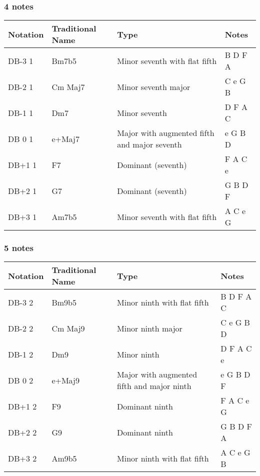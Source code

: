 \documentclass[]{report}
\begin{document}
\subsubsection*{4 notes}
\begin{table}[H]
\centering
\begin{tabularx}{\textwidth}{ll>{\raggedright\arraybackslash}Xl}
\toprule
Notation & Traditional Name & Type & Notes \\
\midrule
\textsf{DB-3} 1 & Bm7b5 & Minor seventh with flat fifth & B D F A \\
\textsf{DB-2} 1 & Cm Maj7 & Minor seventh major & C e G B \\
\textsf{DB-1} 1 & Dm7 & Minor seventh & D F A C \\
\textsf{DB 0} 1 & e+Maj7 & Major with augmented fifth and major seventh & e G B D \\
\textsf{DB+1} 1 & F7 & Dominant (seventh) & F A C e \\
\textsf{DB+2} 1 & G7 & Dominant (seventh) & G B D F \\
\textsf{DB+3} 1 & Am7b5 & Minor seventh with flat fifth & A C e G \\
\bottomrule
\end{tabularx}
\end{table}
\subsubsection*{5 notes}
\begin{table}[H]
\centering
\begin{tabularx}{\textwidth}{ll>{\raggedright\arraybackslash}Xl}
\toprule
Notation & Traditional Name & Type & Notes \\
\midrule
\textsf{DB-3} 2 & Bm9b5 & Minor ninth with flat fifth & B D F A C \\
\textsf{DB-2} 2 & Cm Maj9 & Minor ninth major & C e G B D \\
\textsf{DB-1} 2 & Dm9 & Minor ninth & D F A C e \\
\textsf{DB 0} 2 & e+Maj9 & Major with augmented fifth and major ninth & e G B D F \\
\textsf{DB+1} 2 & F9 & Dominant ninth & F A C e G \\
\textsf{DB+2} 2 & G9 & Dominant ninth & G B D F A \\
\textsf{DB+3} 2 & Am9b5 & Minor ninth with flat fifth & A C e G B \\
\bottomrule
\end{tabularx}
\end{table}
\end{document}
